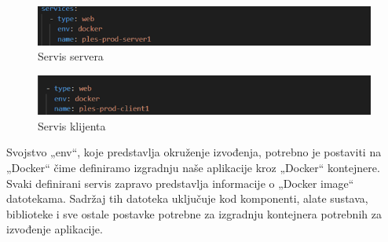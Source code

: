 \begin{figure}[H]
			\includegraphics[scale=0.9]{slike/Slika3.PNG} %
			\centering
			\caption{Servis servera}
			\label{fig:ServerServis}
		\end{figure}

\begin{figure}[H]
			\includegraphics[scale=0.9]{slike/Slika4.PNG} %
			\centering
			\caption{Servis klijenta}
			\label{fig:ClientServis}
		\end{figure}

Svojstvo „env“, koje predstavlja okruženje izvođenja, potrebno je postaviti na „Docker“ čime definiramo izgradnju naše aplikacije kroz „Docker“ kontejnere.
Svaki definirani servis zapravo predstavlja informacije o „Docker image“ datotekama. Sadržaj tih datoteka uključuje kod komponenti, alate sustava, biblioteke i sve ostale postavke potrebne za izgradnju kontejnera potrebnih za izvođenje aplikacije.

